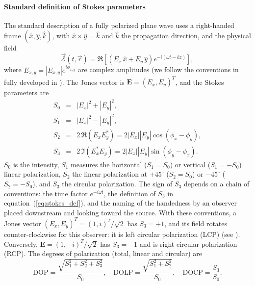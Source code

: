 \documentclass{iucr}
\begin{document}
\paragraph{Standard definition of Stokes parameters}
\label{sec:polarization_stokes}

The standard description of a fully polarized plane wave uses a right-handed frame $(\hat{x},\hat{y},\hat{k})$, with $\hat{x}\times\hat{y}=\hat{k}$ and $\hat{k}$ the propagation direction, and the physical field
\begin{equation}\label{eq:physical_wave}
    \vec{\mathcal{E}}(t,\vec{r})
    = \Re\left[\left(E_x\,\hat{x} + E_y\,\hat{y}\right) e^{-i(\omega t - k z)}\right],
\end{equation}
where $E_{x,y}=|E_{x,y}|e^{i\phi_{x,y}}$ are complex amplitudes (we follow the conventions in \cite{Detlefs2012} fully developed in \cite{PolarizationDraft}).
The Jones vector \cite{Jones1941a} is $\mathbf{E}=(E_x, E_y)^T$, and the Stokes parameters \cite{born_wolf} are
\begin{eqnarray}\label{eq:stokes_def}
    S_0 &=& |E_x|^2 + |E_y|^2, \nonumber \\
    S_1 &=& |E_x|^2 - |E_y|^2, \nonumber \\
	S_2 &=& 2\,\Re(E_x E_y^*) = 2 |E_x||E_y| \cos(\phi_x-\phi_y), \nonumber \\
	S_3 &=& 2\,\Im(E_x^* E_y)=2 |E_x||E_y| \sin(\phi_y - \phi_x).
\end{eqnarray}
$S_0$ is the intensity, $S_1$ measures the horizontal ($S_1=S_0$) or vertical ($S_1=-S_0$) linear polarization, $S_2$ the linear polarization at $+45^\circ$ ($S_2=S_0$) or $-45^\circ$ ($S_2=-S_0$), and $S_3$ the circular polarization. The sign of $S_3$ depends on a chain of conventions: the time factor $e^{-i\omega t}$, the definition of $S_3$ in equation~(\ref{eq:stokes_def}), and the naming of the handedness by an observer placed downstream and looking toward the source. With these conventions, a Jones vector $(E_x,E_y)^T=(1,i)^T/\sqrt{2}$ has $S_3=+1$, and its field rotates counter-clockwise for this observer: it is left circular polarization (LCP) (see \cite{PolarizationDraft}). Conversely, $\mathbf{E}=(1,-i)^T/\sqrt{2}$ has $S_3=-1$ and is right circular polarization (RCP).
The degrees of polarization (total, linear and circular) are
\begin{equation}\label{eq:dop}
    \mathrm{DOP} = \frac{\sqrt{S_1^2+S_2^2+S_3^2}}{S_0}, \quad
    \mathrm{DOLP} = \frac{\sqrt{S_1^2+S_2^2}}{S_0}, \quad
    \mathrm{DOCP} = \frac{S_3}{S_0}.
\end{equation}
\end{document}
